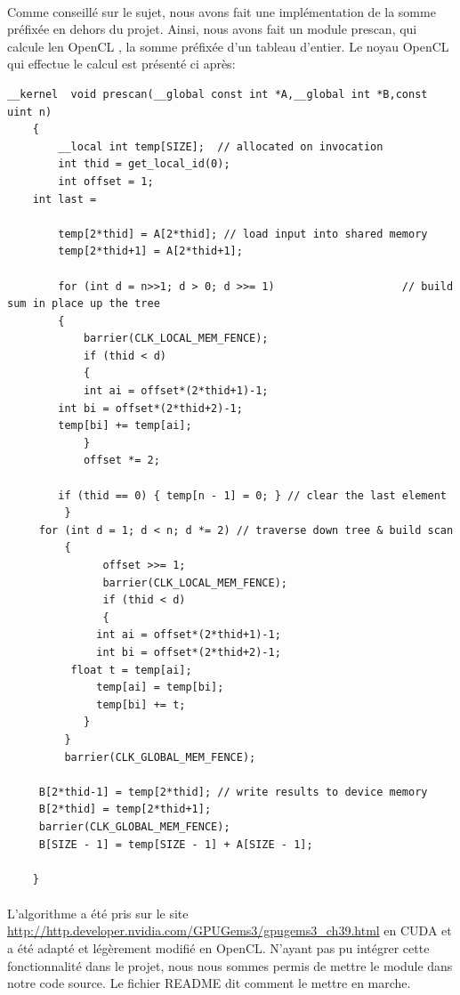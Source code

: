 \documentclass[a4paper,11pt]{report}
\begin{document}
\paragraph{}
Comme conseillé sur le sujet, nous avons fait une implémentation de la somme préfixée en dehors du projet. Ainsi, nous avons fait un module prescan, qui calcule len OpenCL , la somme préfixée d'un tableau d'entier. Le noyau OpenCL qui effectue le calcul est présenté ci après:
\vfill
\begin{lstlisting}[style=CStyle]
    __kernel  void prescan(__global const int *A,__global int *B,const  uint n)  
    {  
        __local int temp[SIZE];  // allocated on invocation  
        int thid = get_local_id(0);  
    	int offset = 1;  
	int last = 

    	temp[2*thid] = A[2*thid]; // load input into shared memory  
    	temp[2*thid+1] = A[2*thid+1];  
  	
    	for (int d = n>>1; d > 0; d >>= 1)                    // build sum in place up the tree  
    	{   
    	    barrier(CLK_LOCAL_MEM_FENCE);
       	    if (thid < d)  
       	    {  
	        int ai = offset*(2*thid+1)-1;  
		int bi = offset*(2*thid+2)-1;  
		temp[bi] += temp[ai];  		       
    	    }  
    	    offset *= 2;  
   
	    if (thid == 0) { temp[n - 1] = 0; } // clear the last element  
         }            
	 for (int d = 1; d < n; d *= 2) // traverse down tree & build scan  
    	 {  
     	       offset >>= 1;  
               barrier(CLK_LOCAL_MEM_FENCE);
               if (thid < d)                       
               {  
	       	  int ai = offset*(2*thid+1)-1;  
    	  	  int bi = offset*(2*thid+2)-1;  
		  float t = temp[ai];  
    	  	  temp[ai] = temp[bi];  
    	  	  temp[bi] += t;   
          	}  
    	 }  
     	 barrier(CLK_GLOBAL_MEM_FENCE);

	 B[2*thid-1] = temp[2*thid]; // write results to device memory  
	 B[2*thid] = temp[2*thid+1];  
	 barrier(CLK_GLOBAL_MEM_FENCE);	 
	 B[SIZE - 1] = temp[SIZE - 1] + A[SIZE - 1];

    }  
\end{lstlisting}
\paragraph{}
L'algorithme a été pris sur le site \url{http://http.developer.nvidia.com/GPUGems3/gpugems3_ch39.html} en CUDA et a été adapté et légèrement modifié en OpenCL. N'ayant pas pu intégrer cette fonctionnalité dans le projet, nous nous sommes permis de mettre le module dans notre code source. Le fichier README dit comment le mettre en marche. 
\end{document}
